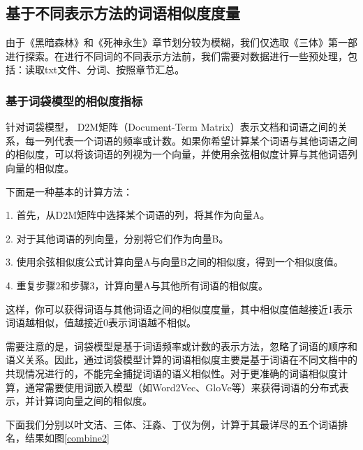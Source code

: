 \documentclass[12pt]{xjtureport}
\begin{document}
\subsection{基于不同表示方法的词语相似度度量}
由于《黑暗森林》和《死神永生》章节划分较为模糊，我们仅选取《三体》第一部进行探索。在进行不同词的不同表示方法前，我们需要对数据进行一些预处理，包括：读取txt文件、分词、按照章节汇总。

\subsubsection{基于词袋模型的相似度指标}
针对词袋模型， D2M矩阵（Document-Term Matrix）表示文档和词语之间的关系，每一列代表一个词语的频率或计数。如果你希望计算某个词语与其他词语之间的相似度，可以将该词语的列视为一个向量，并使用余弦相似度计算与其他词语列向量的相似度。

下面是一种基本的计算方法：

1.	首先，从D2M矩阵中选择某个词语的列，将其作为向量A。

2.	对于其他词语的列向量，分别将它们作为向量B。

3.	使用余弦相似度公式计算向量A与向量B之间的相似度，得到一个相似度值。

4.	重复步骤2和步骤3，计算向量A与其他所有词语的相似度。

这样，你可以获得词语与其他词语之间的相似度度量，其中相似度值越接近1表示词语越相似，值越接近0表示词语越不相似。

需要注意的是，词袋模型是基于词语频率或计数的表示方法，忽略了词语的顺序和语义关系。因此，通过词袋模型计算的词语相似度主要是基于词语在不同文档中的共现情况进行的，不能完全捕捉词语的语义相似性。对于更准确的词语相似度计算，通常需要使用词嵌入模型（如Word2Vec、GloVe等）来获得词语的分布式表示，并计算词向量之间的相似度。

下面我们分别以叶文洁、三体、汪淼、丁仪为例，计算于其最详尽的五个词语排名，结果如图\ref{combine2}
\end{document}
